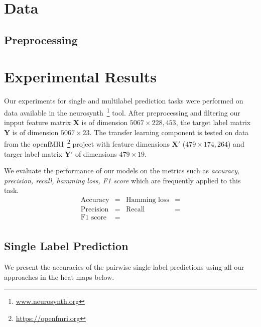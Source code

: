 \documentclass{article} %
\begin{document}
\section{Data}

\subsection{Preprocessing}

\section{Experimental Results}
Our experiments for single and multilabel prediction tasks were performed on data available in the neurosynth~\footnote{\protect \url{www.neurosynth.org}} tool. After preprocessing and filtering our inpput feature matrix  $\mathbf{X}$ is of dimension $5067 \times 228,453$, the target label matrix $\mathbf{Y}$ is of dimension $5067 \times 23$. The transfer learning component is tested on data from the openfMRI~\footnote{\protect \url{https://openfmri.org}} project with feature dimensions $\mathbf{X}'$ ($479 \times 174,264$) and targer label matrix $\mathbf{Y}'$ of dimensions $479 \times 19$.

We evaluate the performance of our models on the metrics such as \textit{accuracy, precision, recall, hamming loss, F1 score} which are frequently applied to this task.
\begin{align*}
 \text{Accuracy} &= & \text{Hamming loss}&= \\
 \text{Precision} &= & \text{Recall}&= \\
 \text{F1 score} &= & & \\
\end{align*}

 \subsection{Single Label Prediction}
 We present the accuracies of the pairwise single label predictions using all our approaches in the heat maps below.
\end{document}
